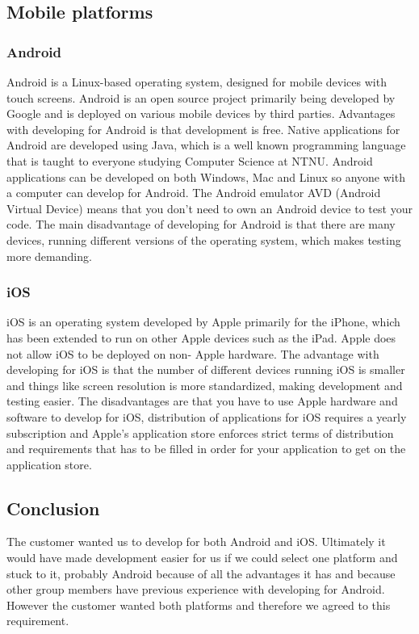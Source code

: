 \subsection{Mobile platforms}

\subsubsection*{Android}

    Android is a Linux-based operating system, designed for mobile devices with touch screens.
    Android is an open source project primarily being developed by Google and is deployed on various
    mobile devices by third parties.\cite{android} Advantages with developing for Android is that
    development is free. Native applications for Android are developed using Java, which is a well
    known programming language that is taught to everyone studying Computer Science at NTNU. Android
    applications can be developed on both Windows, Mac and Linux so anyone with a computer can
    develop for Android. The Android emulator AVD (Android Virtual Device) means that you don't need
    to own an Android device to test your code. The main disadvantage of developing for Android is
    that there are many devices, running different versions of the operating system, which makes
    testing more demanding.

\subsubsection*{iOS}

    iOS is an operating system developed by Apple primarily for the iPhone, which has been extended
    to run on other Apple devices such as the iPad. Apple does not allow iOS to be deployed on non-
    Apple hardware.\cite{ios} The advantage with developing for iOS is that the number of different
    devices running iOS is smaller and things like screen resolution is more standardized, making
    development and testing easier. The disadvantages are that you have to use Apple hardware and
    software to develop for iOS, distribution of applications for iOS requires a yearly
    subscription\cite{iosCost} and Apple's application store enforces strict terms of distribution
    and requirements that has to be filled in order for your application to get on the application
    store.

\subsection{Conclusion}

    The customer wanted us to develop for both Android and iOS.
    Ultimately it would have made development easier for us if we could select one platform and
    stuck to it, probably Android because of all the advantages it has and because other group
    members have previous experience with developing for Android. However the customer wanted both
    platforms and therefore we agreed to this requirement.
